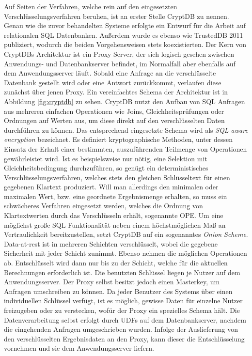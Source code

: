 Auf Seiten der Verfahren, welche rein auf den eingesetzten Verschlüsselungsverfahren beruhen, ist an erster Stelle CryptDB \cite{Popa2011}\cite{Popa2012} zu nennen. Genau wie die zuvor behandelten Systeme erfolgte ein Entwurf für die Arbeit auf relationalen \ac{SQL} Datenbanken. Außerdem wurde es ebenso wie TrustedDB 2011 publiziert, wodurch die beiden Vorgehensweisen stets koexistierten. Der Kern von CryptDBs Architektur ist ein Proxy Server, der sich logisch gesehen zwischen Anwendungs- und Datenbankserver befindet, im Normalfall aber ebenfalls auf dem Anwendungsserver läuft. Sobald eine Anfrage an die verschlüsselte Datenbank gestellt wird oder eine Antwort zurückkommt, verlaufen diese zunächst über jenen Proxy. Ein vereinfachtes Schema der Architektur ist in Abbildung \ref{fig:cryptdb} zu sehen. CryptDB nutzt den Aufbau von \ac{SQL} Anfragen aus mehreren einfachen Operationen wie Joins, Gleichheitsprüfungen oder Ordnungen auf Werten aus, um diese direkt auf den verschlüsselten Daten durchführen zu können. Das entsprechend eingesetzte Schema wird als \textit{SQL aware encryption} bezeichnet. Es definiert kryptographische Methoden, unter dessen Einsatz der Erhalt einer bestimmten, auszuführenden Teilmenge von Operationen gewährleistet wird. Ist es beispielsweise nur nötig, eine Selektion mit Gleichheitsbedingung durchzuführen, so genügt ein deterministisches Verschlüsselungsverfahren, welches stets den gleichen Schlüsseltext für einen gegebenen Klartext produziert. Will man allerdings den minimalen oder maximalen Wert, bzw. eine geordnete Ergebnismenge erhalten, so muss ein schwächeres Verfahren eingesetzt werden, welches die Ordnung von Klartextwerten durch das Verschlüsseln erhält, sogenannte \ac{OPE}. Um eine möglichst große \ac{SQL} Funktionalität neben einem höchstmöglichen Maß an Vertraulichkeit bereitzustellen, setzt CryptDB auf ein sogenanntes \textit{Onion Scheme}. Data-at-rest ist in mehreren Schichten verschlüsselt, wobei die gegebene Sicherheit mit jeder Schicht zunimmt. Ebenso nehmen die möglichen Operationen ab. Entschlüsselt wird dann nur bis zu der Schicht, welche für die aktuellen Berechnungen erforderlich ist. Die benutzten Schlüssel liegen je Nutzer auf dem Anwendungsserver. Der Proxy selbst besitzt jedoch einen Masterkey, um Anfragen umschreiben zu können. Da jeder Benutzer des Systems über einen individuellen Schlüssel verfügt, ist es möglich, gewisse Daten für einzelne Nutzer freizugeben oder zu verstecken, wofür der Proxy ein spezielles Schema hält. Die Datenverarbeitung selbst erfolgt durch \acp{UDF} auf dem Datenbankserver, nachdem die eingehenden Anfragen umgeschrieben wurden. Infolge der Auslieferung von den verschlüsselten Ergebnisdaten an den Proxy, kann dieser die Entschlüsselung vornehmen und sie dem Anwendungsserver liefern.

